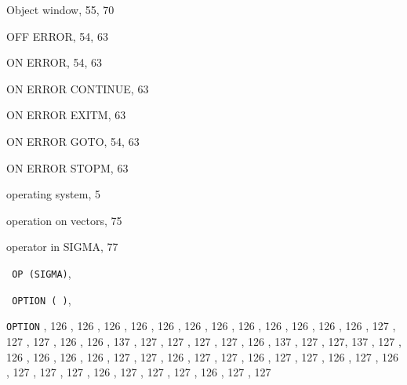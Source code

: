 \begin{theindex}
  \indexspace

  \item Object window, 55, 70
  \item {\ttfamily  OFF ERROR}, 54, 63
  \item {\ttfamily  ON ERROR}, 54, 63
  \item {\ttfamily  ON ERROR CONTINUE}, 63
  \item {\ttfamily  ON ERROR EXITM}, 63
  \item {\ttfamily  ON ERROR GOTO}, 54, 63
  \item {\ttfamily  ON ERROR STOPM}, 63
  \item operating system, 5
  \item operation on vectors, 75
  \item operator in SIGMA, 77
  \item \texttt  { OP \textrm  {(SIGMA)}}, 
  \item \texttt  { OPTION{ \textrm {( )}}}, 
  \item {\tt OPTION}
    , 126
    , 126
    , 126
    , 126
    , 126
    , 126
    , 126
    , 126
    , 126
    , 126
    , 126
    , 126
    , 127
    , 127
    , 127
    , 126
    , 126
    , 137
    , 127
    , 127
    , 127
    , 127
    , 126
    , 137
    , 127
    , 127, 137
    , 127
    , 126
    , 126
    , 126
    , 126
    , 127
    , 127
    , 126
    , 127
    , 127
    , 126
    , 127
    , 127
    , 126
    , 127
    , 126
    , 127
    , 127
    , 127
    , 126
    , 127
    , 127
    , 127
    , 126
    , 127
    , 127

\end{theindex}
